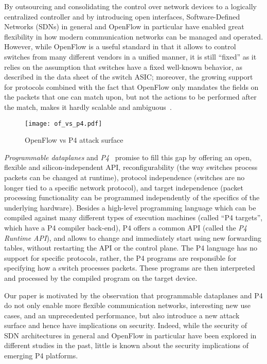 \documentclass[10pt,sigconf]{acmart}
\begin{document}
By outsourcing and consolidating the control over
network devices to a logically centralized controller
and by introducing open interfaces,
Software-Defined Networks (SDNs) in general and OpenFlow in particular
have enabled great flexibility
in how modern communication networks can be managed and operated.
However, while OpenFlow is a useful standard in that it allows to control 
switches from many different 
vendors in a unified manner, it is still ``fixed'' as it relies on the assumption that 
switches have a fixed well-known
behavior, as described in the data sheet of the switch ASIC;
moreover, the growing support for protocols combined with the
fact that OpenFlow only mandates the fields on the packets that one can match
upon, but not the actions to be performed after the match, makes it hardly scalable
and ambiguous~\cite{rep17}.

\begin{figure}[tp]
\centering
\texttt{[image: of\_vs\_p4.pdf]}
\caption{OpenFlow vs P4 attack surface}\label{fig:of_vs_p4}
\end{figure}

\emph{Programmable dataplanes} and \emph{P4}~\cite{p4}
promise to fill this gap by offering an
open, flexible and silicon-independent API, 
reconfigurability (the way switches process packets 
can be changed at runtime),
protocol independence (switches are no longer tied to a 
specific network protocol), and target independence 
(packet processing functionality can be programmed 
independently of the specifics of the underlying hardware).
Besides a high-level programming language 
which can be compiled against many different types of execution machines
(called 
``P4 targets'', which have a P4 compiler back-end),
P4 offers a common API (called the \emph{P4 Runtime API}),
and allows to change and
immediately start using new forwarding tables, without
restarting the API or the control plane. 
The P4 language has no support 
for specific protocols, rather, the P4 programs are responsible for
specifying how a switch processes packets. 
These programs 
are then interpreted and processed by the compiled program
on the target device.

Our paper is motivated by the observation that programmable
dataplanes and P4 do not only
enable more flexible communication networks, interesting new use cases,
and an unprecedented performance, 
but also introduce a new attack surface and hence have 
implications on security.
Indeed, while the security of SDN architectures in general
and OpenFlow in particular have been explored in different
studies in the past, little is known about the security implications
of emerging P4 platforms.
\end{document}
